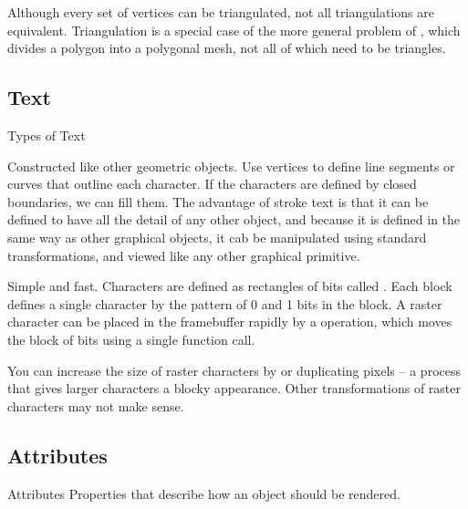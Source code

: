\documentclass[../notes.tex]{subfiles}
\begin{document}
        Although every set of vertices can be triangulated, not all triangulations are equivalent.
        Triangulation is a special case of the more general problem of
        , which divides a polygon into a polygonal mesh,
        not all of which need to be triangles.

      \subsection{Text}
        \begin{sidenote}{Types of Text}
          $ $\vspace{-1em}
          \begin{descriptimize}
            \item[Stroke Text] Constructed like other geometric objects.
              Use vertices to define line segments or curves that outline each character.
              If the characters are defined by closed boundaries, we can fill them.
              The advantage of stroke text is that it can be defined to have all the detail
              of any other object, and because it is defined in the same way as other graphical
              objects, it cab be manipulated using standard transformations,
              and viewed like any other graphical primitive.
            \item[Raster Text] Simple and fast.
              Characters are defined as rectangles of bits called .
              Each block defines a single character by the pattern of 0 and 1 bits
              in the block.
              A raster character can be placed in the framebuffer rapidly
              by a  operation,
              which moves the block of bits using a single function call.

              You can increase the size of raster characters by 
              or duplicating pixels -- a process that gives larger characters a blocky
              appearance.
              Other transformations of raster characters may not make sense.
          \end{descriptimize}
        \end{sidenote}

      \subsection{Attributes}
        \begin{definition}{Attributes}
          Properties that describe how an object should be rendered.
        \end{definition}
\end{document}

